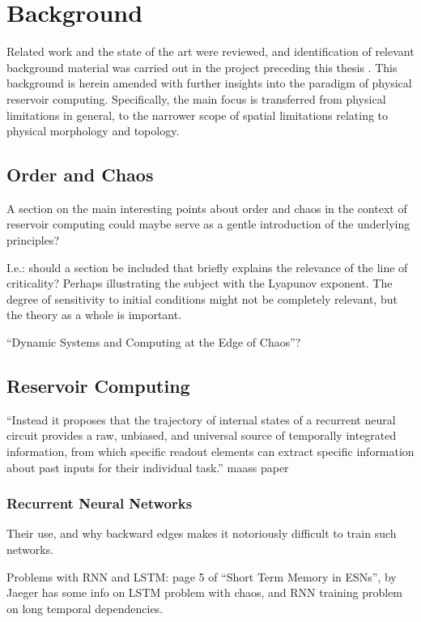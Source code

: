 \chapter{Background}

Related work and the state of the art were reviewed, and identification of
relevant background material was carried out in the project preceding this
thesis \cite{aven_exploring_2019}. This background is herein amended with
further insights into the paradigm of physical reservoir
computing. Specifically, the main focus is transferred from physical limitations
in general, to the narrower scope of spatial limitations relating to physical
morphology and topology.

\section{Order and Chaos}

A section on the main interesting points about order and chaos in the context of
reservoir computing could maybe serve as a gentle introduction of the underlying
principles?

I.e.: should a section be included that briefly explains the relevance of the
line of criticality? Perhaps illustrating the subject with the Lyapunov
exponent. The degree of sensitivity to initial conditions might not be
completely relevant, but the theory as a whole is important.

``Dynamic Systems and Computing at the Edge of Chaos''?

\section{Reservoir Computing}

``Instead it proposes that the trajectory of internal states of a recurrent
neural circuit provides a raw, unbiased, and universal source of temporally
integrated information, from which specific readout elements can extract
specific information about past inputs for their individual task.'' maass paper

\subsection{Recurrent Neural Networks}

Their use, and why backward edges makes it notoriously difficult to train such
networks.

Problems with RNN and LSTM: page 5 of ``Short Term Memory in ESNs'', by Jaeger
has some info on LSTM problem with chaos, and RNN training problem on long
temporal dependencies.

